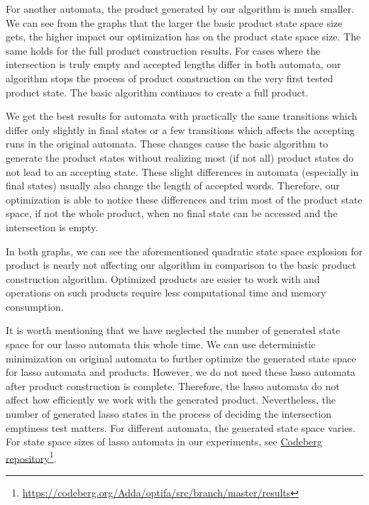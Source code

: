 For another automata, the product generated by our algorithm is much smaller. We can see from the graphs that the larger the basic product state space size gets, the higher impact our optimization has on the product state space size. The same holds for the full product construction results. For cases where the intersection is truly empty and accepted lengths differ in both automata, our algorithm stops the process of product construction on the very first tested product state. The basic algorithm continues to create a full product.

We get the best results for automata with practically the same transitions which differ only slightly in final states or a few transitions which affects the accepting runs in the original automata. These changes cause the basic algorithm to generate the product states without realizing most (if not all) product states do not lead to an accepting state. These slight differences in automata (especially in final states) usually also change the length of accepted words. Therefore, our optimization is able to notice these differences and trim most of the product state space, if not the whole product, when no final state can be accessed and the intersection is empty.

In both graphs, we can see the aforementioned quadratic state space explosion for product is nearly not affecting our algorithm in comparison to the basic product construction algorithm. Optimized products are easier to work with and operations on such products require less computational time and memory consumption.

It is worth mentioning that we have neglected the number of generated state space for our lasso automata this whole time. We can use deterministic minimization on original automata to further optimize the generated state space for lasso automata and products. However, we do not need these lasso automata after product construction is complete. Therefore, the lasso automata do not affect how efficiently we work with the generated product. Nevertheless, the number of generated lasso states in the process of deciding the intersection emptiness test matters. For different automata, the generated state space varies. For state space sizes of lasso automata in our experiments, see \href{https://codeberg.org/Adda/optifa/src/branch/master/results}{Codeberg repository}\footnote{{\href{https://codeberg.org/Adda/optifa/src/branch/master/results}{https://codeberg.org/Adda/optifa/src/branch/master/results}}}.

